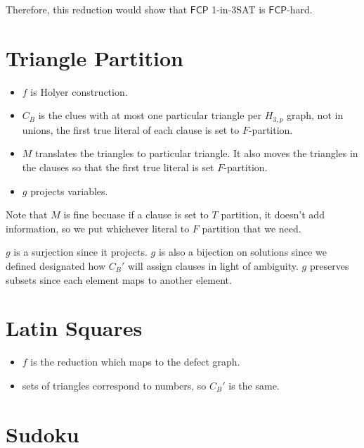 \documentclass[runningheads,a4paper]{llncs}
\begin{document}
Therefore, this reduction would show that $\mathsf{FCP}$ 1-in-3SAT is $\mathsf{FCP}$-hard. 

\section{Triangle Partition}

\begin{itemize}
\item $f$ is Holyer construction.
\item $C_B$ is the clues with at most one particular triangle per $H_{3,p}$ graph, not in unions, the first true literal of each clause is set to $F$-partition. 
\item $M$ translates the triangles to particular triangle. It also moves the triangles in the clauses so that the first true literal is set $F$-partition.
\item $g$ projects variables. 
\end{itemize}

Note that $M$ is fine becuase if a clause is set to $T$ partition, it doesn't add information, so we put whichever literal to $F$ partition that we need. 

$g$ is a surjection since it projects. $g$ is also a bijection on solutions since we defined designated how $C_B'$ will assign clauses in light of ambiguity. $g$ preserves subsets since each element maps to another element. 

\section{Latin Squares}

\begin{itemize}
\item $f$ is the reduction which maps to the defect graph.
\item sets of triangles correspond to numbers, so $C_B'$ is the same. 
\end{itemize}

\section{Sudoku}
\end{document}

